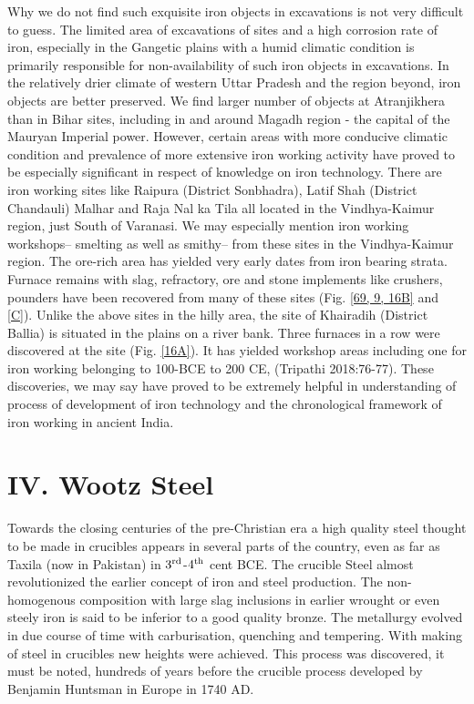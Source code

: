 Why we do not find such exquisite iron objects in excavations is not very difficult to guess. The limited area of excavations of sites and a high corrosion rate of iron, especially in the Gangetic plains with a humid climatic condition is primarily responsible for non-availability of such iron objects in excavations. In the relatively drier climate of western Uttar Pradesh and the region beyond, iron objects are better preserved. We find larger number of objects at Atranjikhera than in Bihar sites, including in and around Magadh region - the capital of the Mauryan Imperial power. However, certain areas with more conducive climatic condition and prevalence of more extensive iron working activity have proved to be especially significant in respect of knowledge on iron technology.  There are iron working sites like Raipura (District Sonbhadra), Latif Shah (District Chandauli) Malhar and Raja Nal ka Tila all located in the Vindhya-Kaimur region, just South of Varanasi. We may especially mention iron working workshops– smelting as well as smithy– from these sites in the Vindhya-Kaimur region. The ore-rich area has yielded very early dates from iron bearing strata. Furnace remains with slag, refractory, ore and stone implements like crushers, pounders have been recovered from many of these sites (Fig. \ref{69, 9, 16B} and \ref{C}). Unlike the above sites in the hilly area, the site of Khairadih (District Ballia) is situated in the plains on a river bank. Three furnaces in a row were discovered at the site (Fig. \ref{16A}). It has yielded workshop areas including one for iron working belonging to 100-BCE to 200 CE, (Tripathi 2018:76-77). These discoveries, we may say have proved to be extremely helpful in understanding of process of development of iron technology  and the chronological framework of iron working in ancient India.

\vspace{-.3cm}

\section*{IV. Wootz Steel}\label{section-4}

\vspace{-.2cm}

Towards the closing centuries of the pre-Christian era a high quality steel thought to be made in crucibles appears in several parts of the country, even as far as Taxila (now in Pakistan) in $3^{\rm rd}$-$4^{\rm th}$ cent BCE. The crucible Steel almost revolutionized the earlier concept of iron and steel production. The non-homogenous composition with large slag inclusions in earlier wrought or even steely iron is said to be inferior to a good quality bronze. The metallurgy evolved in due course of time with carburisation, quenching and tempering. With making of steel in crucibles new heights were achieved. This process was discovered, it must be noted, hundreds of years before the crucible process developed by Benjamin Huntsman in Europe in 1740 AD.

